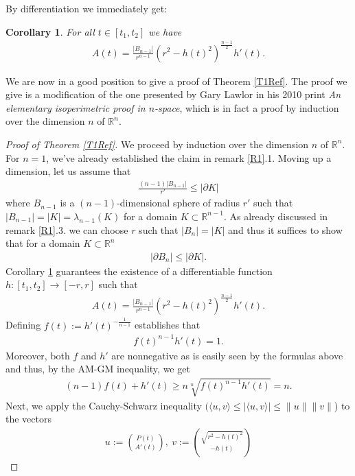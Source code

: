 \documentclass[12pt, a4paper, titlepage]{article}
\newtheorem{corollary}{Corollary}
\begin{document}
By differentiation we immediately get:
\begin{corollary} \label{C1} For all $t \in [t_1,t_2]$ we have
\begin{align*}
A(t) = \frac{|B_{n-1}|}{r^{n-1}} (r^2-h(t)^2)^\frac{n-1}{2} h'(t).
\end{align*}
\end{corollary}
We are now in a good position to give a proof of Theorem \ref{T1Ref}. The proof we give is a modification of the one presented by Gary Lawlor in his 2010 print \textit{An elementary isoperimetric proof in $n$-space}, which is in fact a proof by induction over the dimension $n$ of $\mathbb{R}^n$. 
\begin{proof}[Proof of Theorem \ref{T1Ref}] We proceed by induction over the dimension $n$ of $\mathbb{R}^n$. For $n=1$, we've already established the claim in remark \ref{R1}.1. Moving up a dimension, let us assume that
\begin{align*}
\frac{(n-1)|B_{n-1}|}{r'} \leq | \partial K|
\end{align*}
where $B_{n-1}$ is a $(n-1)$-dimensional sphere of radius $r'$ such that $|B_{n-1}|=|K|= \lambda_{n-1}(K)$ for a domain $K \subset \mathbb{R}^{n-1}$. 
As already discussed in remark \ref{R1}.3. we can choose $r$ such that $|B_n|=|K|$ and thus it suffices to show that for a domain $K  \subset \mathbb{R}^n$
\begin{align*}
| \partial B_n| \leq | \partial K|.
\end{align*}
Corollary \ref{C1} guarantees the existence of a differentiable function $h: [t_1,t_2]\to [-r,r]$ such that 
\begin{align*}\label{eq:1}
A(t) = \frac{|B_{n-1}|}{r^{n-1}} (r^2-h(t)^2)^\frac{n-1}{2} h'(t).
\end{align*} 
Defining $f(t):= h'(t)^{-\frac{1}{n-1}}$ establishes that
\begin{align*}
f(t)^{n-1}h'(t)=1.
\end{align*}
Moreover, both $f$ and $h'$ are nonnegative as is easily seen by the formulas above and thus, by the AM-GM inequality, we get
\begin{align}
(n-1)f(t)+h'(t) \geq n \sqrt[n]{f(t)^{n-1}h'(t)}=n.
\end{align}
Next, we apply the Cauchy-Schwarz inequality $( \langle u ,v \rangle \leq | \langle u,v \rangle| \leq \|u\| \|v\|$) to the vectors
\begin{align*}
u := \binom{P(t)}{A'(t)}, \ v:= \binom{ \sqrt{r^2-h(t)^2}}{-h(t)}
\end{align*}

\end{proof}
\end{document}
